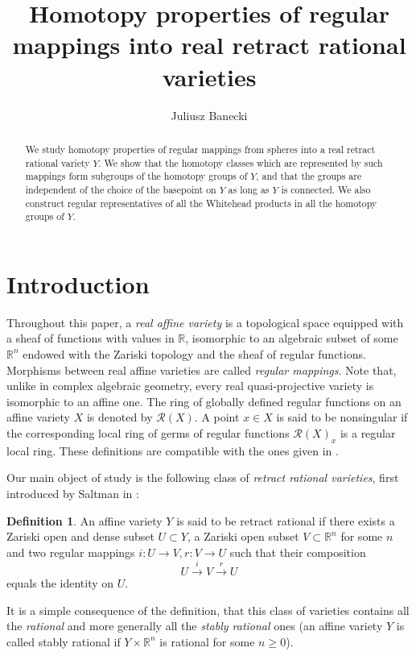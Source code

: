 \documentclass{article}
\title{Homotopy properties of regular mappings into real retract rational varieties}
\author{Juliusz Banecki}
\date{}
\theoremstyle{plain}
\theoremstyle{definition}
\newtheorem{defi}[thm]{Definition}
\theoremstyle{remark}
\newcommand{\R}{\mathbb{R}}
\newcommand{\RR}{\mathcal{R}}
\begin{document}
\maketitle
\renewcommand{\thefootnote}{}%
\renewcommand{\thefootnote}{\arabic{footnote}}%
\begin{abstract}
We study homotopy properties of regular mappings from spheres into a real retract rational variety $Y$. We show that the homotopy classes which are represented by such mappings form subgroups of the homotopy groups of $Y$, and that the groups are independent of the choice of the basepoint on $Y$ as long as $Y$ is connected. We also construct regular representatives of all the Whitehead products in all the homotopy groups of $Y$.
\end{abstract}
\section{Introduction}
Throughout this paper, a \emph{real affine variety} is a topological space equipped with a sheaf of functions with values in $\R$, isomorphic to an algebraic subset of some $\mathbb{R}^n$ endowed with the Zariski topology and the sheaf of regular functions. Morphisms between real affine varieties are called \emph{regular mappings}. Note that, unlike in complex algebraic geometry, every real quasi-projective variety is isomorphic to an affine one. The ring of globally defined regular functions on an affine variety $X$ is denoted by $\RR(X)$. A point $x\in X$ is said to be nonsingular if the corresponding local ring of germs of regular functions $\RR(X)_x$ is a regular local ring. These definitions are compatible with the ones given in \cite{bochnakRealAlgebraicGeometry1998,mangolteRealAlgebraicVarieties2020}.



Our main object of study is the following class of \emph{retract rational varieties}, first introduced by Saltman in \cite{saltmanMultiplicativeFieldInvariants1987}:
\begin{defi}
An affine variety $Y$ is said to be retract rational if there exists a Zariski open and dense subset $U\subset Y$, a Zariski open subset $V\subset \R^n$ for some $n$ and two regular mappings $i:U\rightarrow V, r:V\rightarrow U$ such that their composition
\begin{equation*}
    U\xrightarrow{i} V\xrightarrow{r} U 
\end{equation*}
equals the identity on $U$.
\end{defi}
It is a simple consequence of the definition, that this class of varieties contains all the \emph{rational} and more generally all the \emph{stably rational} ones (an affine variety $Y$ is called stably rational if $Y\times \R^n$ is rational for some $n\geq 0$).
\end{document}
